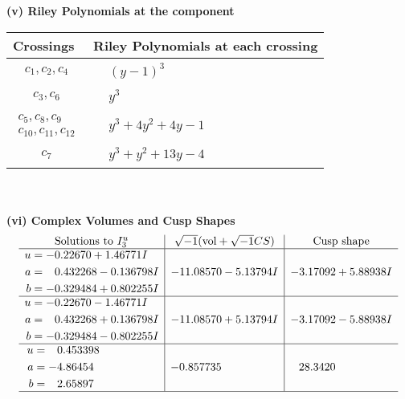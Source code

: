 \documentclass[1p]{elsarticle_modified}
\theoremstyle{definition}
\newcommand{\I}{\sqrt{-1}}
\begin{document}
\flushleft \textbf{(v) Riley Polynomials at the component}\newline \\
\begin{tabular}{m{50pt}|m{274pt}}
Crossings & \hspace{64pt}Riley Polynomials at each crossing \\
\hline $$\begin{aligned}c_{1},c_{2},c_{4}\end{aligned}$$&$\begin{aligned}
&(y-1)^3
\end{aligned}$\\
\hline $$\begin{aligned}c_{3},c_{6}\end{aligned}$$&$\begin{aligned}
&y^3
\end{aligned}$\\
\hline $$\begin{aligned}c_{5},c_{8},c_{9}\\c_{10},c_{11},c_{12}\end{aligned}$$&$\begin{aligned}
&y^3+4 y^2+4 y-1
\end{aligned}$\\
\hline $$\begin{aligned}c_{7}\end{aligned}$$&$\begin{aligned}
&y^3+y^2+13 y-4
\end{aligned}$\\
\hline
\end{tabular}\\~\\
\newpage\flushleft \textbf{(vi) Complex Volumes and Cusp Shapes}
$$\begin{array}{c|c|c}  
\text{Solutions to }I^u_{3}& \I (\text{vol} + \sqrt{-1}CS) & \text{Cusp shape}\\
 \hline 
\begin{aligned}
u &= -0.22670 + 1.46771 I \\
a &= \phantom{-}0.432268 - 0.136798 I \\
b &= -0.329484 + 0.802255 I\end{aligned}
 & -11.08570 - 5.13794 I & -3.17092 + 5.88938 I \\ \hline\begin{aligned}
u &= -0.22670 - 1.46771 I \\
a &= \phantom{-}0.432268 + 0.136798 I \\
b &= -0.329484 - 0.802255 I\end{aligned}
 & -11.08570 + 5.13794 I & -3.17092 - 5.88938 I \\ \hline\begin{aligned}
u &= \phantom{-}0.453398\phantom{ +0.000000I} \\
a &= -4.86454\phantom{ +0.000000I} \\
b &= \phantom{-}2.65897\phantom{ +0.000000I}\end{aligned}
 & -0.857735\phantom{ +0.000000I} & \phantom{-}28.3420\phantom{ +0.000000I}\\
 \hline 
 \end{array}$$\newpage\newpage\renewcommand{\arraystretch}{1}
\end{document}
